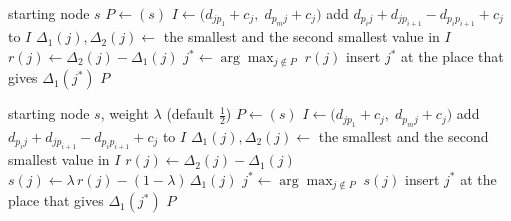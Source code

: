 \documentclass[11pt,a4paper]{article}
\begin{document}
\begin{algorithm}[H]
\caption{Nearest neighbour with greedy 2-regret}
\begin{algorithmic}[1]
\Require starting node $s$
\State $P \gets (s)$ 
    \State $I \gets \bigl(d_{j p_1} + c_j,\; d_{p_m j} + c_j\bigr)$ 
     
      \State add $d_{p_i j} + d_{j p_{i+1}} - d_{p_i p_{i+1}} + c_j$ to $I$
    \EndFor
    \State $\Delta_1(j), \Delta_2(j) \gets$ the smallest and the second smallest value in $I$
    \State $r(j) \gets \Delta_2(j) - \Delta_1(j)$ 
  \EndFor
  \State $j^\ast \gets \arg\max_{j \notin P} \; r(j)$
  \State insert $j^\ast$ at the place that gives $\Delta_1(j^\ast)$
\EndWhile
\State \Return $P$ 
\end{algorithmic}
\end{algorithm}

\begin{algorithm}[H]
\caption{Nearest neighbour with greedy 2-regret + best change of the objective}
\begin{algorithmic}[1]
\Require starting node $s$, weight $\lambda$ (default $\tfrac12$)
\State $P \gets (s)$ 
    \State $I \gets \bigl(d_{j p_1} + c_j,\; d_{p_m j} + c_j\bigr)$ 
     
      \State add $d_{p_i j} + d_{j p_{i+1}} - d_{p_i p_{i+1}} + c_j$ to $I$
    \EndFor
    \State $\Delta_1(j), \Delta_2(j) \gets$ the smallest and the second smallest value in $I$
    \State $r(j) \gets \Delta_2(j) - \Delta_1(j)$ 
    \State $s(j) \gets \lambda\, r(j) - (1 - \lambda)\, \Delta_1(j)$ 
  \EndFor
  \State $j^\ast \gets \arg\max_{j \notin P} \; s(j)$
  \State insert $j^\ast$ at the place that gives $\Delta_1(j^\ast)$
\EndWhile
\State \Return $P$ 
\end{algorithmic}
\end{algorithm}
\end{document}
